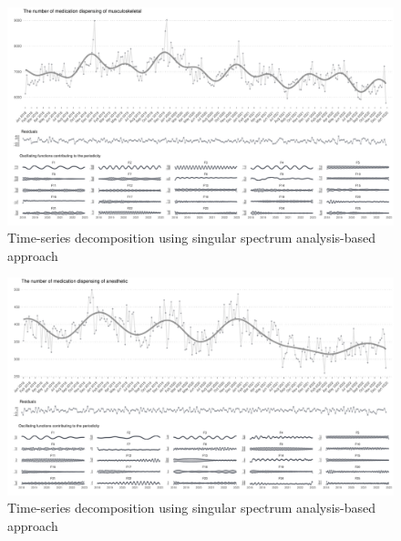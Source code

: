 \documentclass[
  letterpaper,
  DIV=11,
  numbers=noendperiod]{scrartcl}
\begin{document}
\begin{figure}[H]

{\centering \includegraphics[width=1\linewidth,height=\textheight,keepaspectratio]{supplementary_files/figure-pdf/unnamed-chunk-2-9.pdf}

}

\caption{Time-series decomposition using singular spectrum
analysis-based approach}

\end{figure}%

\begin{figure}[H]

{\centering \includegraphics[width=1\linewidth,height=\textheight,keepaspectratio]{supplementary_files/figure-pdf/unnamed-chunk-2-10.pdf}

}

\caption{Time-series decomposition using singular spectrum
analysis-based approach}

\end{figure}%
\end{document}
